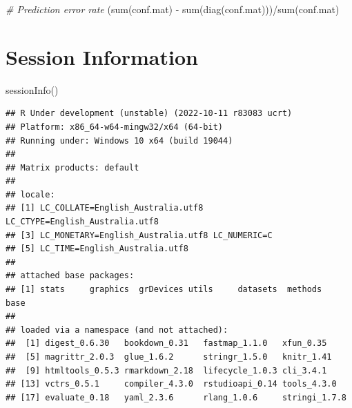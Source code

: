 \documentclass[
]{book}
\newenvironment{Shaded}{\begin{snugshade}}{\end{snugshade}}
\newcommand{\CommentTok}[1]{\textcolor[rgb]{0.56,0.35,0.01}{\textit{#1}}}
\newcommand{\FunctionTok}[1]{\textcolor[rgb]{0.00,0.00,0.00}{#1}}
\newcommand{\NormalTok}[1]{#1}
\newcommand{\SpecialCharTok}[1]{\textcolor[rgb]{0.00,0.00,0.00}{#1}}
\begin{document}
\begin{Shaded}
\begin{Highlighting}[]
\CommentTok{\# Prediction error rate}
\NormalTok{(}\FunctionTok{sum}\NormalTok{(conf.mat) }\SpecialCharTok{{-}} \FunctionTok{sum}\NormalTok{(}\FunctionTok{diag}\NormalTok{(conf.mat)))}\SpecialCharTok{/}\FunctionTok{sum}\NormalTok{(conf.mat)}
\end{Highlighting}
\end{Shaded}

\hypertarget{session-information}{%
\chapter{Session Information}\label{session-information}}

\begin{Shaded}
\begin{Highlighting}[]
\FunctionTok{sessionInfo}\NormalTok{()}
\end{Highlighting}
\end{Shaded}

\begin{verbatim}
## R Under development (unstable) (2022-10-11 r83083 ucrt)
## Platform: x86_64-w64-mingw32/x64 (64-bit)
## Running under: Windows 10 x64 (build 19044)
## 
## Matrix products: default
## 
## locale:
## [1] LC_COLLATE=English_Australia.utf8  LC_CTYPE=English_Australia.utf8   
## [3] LC_MONETARY=English_Australia.utf8 LC_NUMERIC=C                      
## [5] LC_TIME=English_Australia.utf8    
## 
## attached base packages:
## [1] stats     graphics  grDevices utils     datasets  methods   base     
## 
## loaded via a namespace (and not attached):
##  [1] digest_0.6.30   bookdown_0.31   fastmap_1.1.0   xfun_0.35      
##  [5] magrittr_2.0.3  glue_1.6.2      stringr_1.5.0   knitr_1.41     
##  [9] htmltools_0.5.3 rmarkdown_2.18  lifecycle_1.0.3 cli_3.4.1      
## [13] vctrs_0.5.1     compiler_4.3.0  rstudioapi_0.14 tools_4.3.0    
## [17] evaluate_0.18   yaml_2.3.6      rlang_1.0.6     stringi_1.7.8
\end{verbatim}

  
\end{document}
